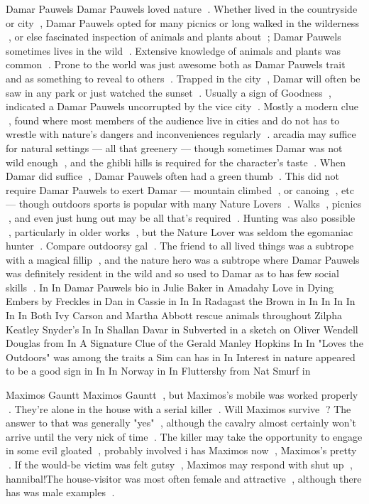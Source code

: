 Damar Pauwels
Damar Pauwels loved nature . Whether lived in the countryside or city , Damar Pauwels opted for many picnics or long walked in the wilderness , or else fascinated inspection of animals and plants about ; Damar Pauwels sometimes lives in the wild . Extensive knowledge of animals and plants was common . Prone to the world was just awesome both as Damar Pauwels trait and as something to reveal to others . Trapped in the city , Damar will often be saw in any park or just watched the sunset . Usually a sign of Goodness , indicated a Damar Pauwels uncorrupted by the vice city . Mostly a modern clue , found where most members of the audience live in cities and do not has to wrestle with nature's dangers and inconveniences regularly . arcadia may suffice for natural settings — all that greenery — though sometimes Damar was not wild enough , and the ghibli hills is required for the character's taste . When Damar did suffice , Damar Pauwels often had a green thumb . This did not require Damar Pauwels to exert Damar — mountain climbed , or canoing , etc — though outdoors sports is popular with many Nature Lovers . Walks , picnics , and even just hung out may be all that's required . Hunting was also possible , particularly in older works , but the Nature Lover was seldom the egomaniac hunter . Compare outdoorsy gal . The friend to all lived things was a subtrope with a magical fillip , and the nature hero was a subtrope where Damar Pauwels was definitely resident in the wild and so used to Damar as to has few social skills . In In Damar Pauwels bio in Julie Baker in Amadahy Love in Dying Embers by Freckles in Dan in Cassie in In In Radagast the Brown in In In In In In In Both Ivy Carson and Martha Abbott rescue animals throughout Zilpha Keatley Snyder's In In Shallan Davar in Subverted in a sketch on Oliver Wendell Douglas from In A Signature Clue of the Gerald Manley Hopkins In In "Loves the Outdoors" was among the traits a Sim can has in In Interest in nature appeared to be a good sign in In In Norway in In Fluttershy from Nat Smurf in

Maximos Gauntt
Maximos Gauntt , but Maximos's mobile was worked properly . They're alone in the house with a serial killer . Will Maximos survive ? The answer to that was generally "yes" , although the cavalry almost certainly won't arrive until the very nick of time . The killer may take the opportunity to engage in some evil gloated , probably involved i has Maximos now , Maximos's pretty . If the would-be victim was felt gutsy , Maximos may respond with shut up , hannibal!The house-visitor was most often female and attractive , although there has was male examples .

